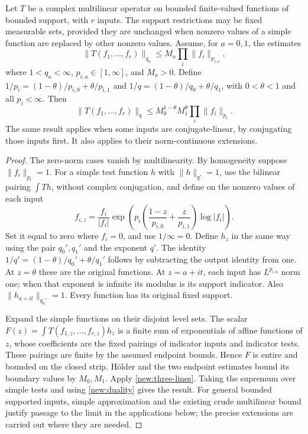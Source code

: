 \documentclass[11pt]{article}
\theoremstyle{definition}
\begin{document}
\begin{lemma}\label{new:interpolation}
Let $T$ be a complex multilinear operator on bounded finite-valued functions of bounded support,
with $r$ inputs. The support restrictions may be fixed measurable sets, provided they are unchanged
when nonzero values of a simple function are replaced by other nonzero values.
Assume, for $a=0,1$, the estimates
\[
 \|T(f_1,\ldots,f_r)\|_{q_a}\leq M_a\prod_i\|f_i\|_{p_{i,a}},
\]
where $1<q_a<\infty$, $p_{i,a}\in[1,\infty]$, and $M_a>0$.
Define $1/p_i=(1-\theta)/p_{i,0}+\theta/p_{i,1}$ and
$1/q=(1-\theta)/q_0+\theta/q_1$, with $0<\theta<1$ and all $p_i<\infty$.
Then
\[
 \|T(f_1,\ldots,f_r)\|_q\leq M_0^{1-\theta}M_1^\theta\prod_i\|f_i\|_{p_i}.
\]
The same result applies when some inputs are conjugate-linear, by conjugating those inputs
first. It also applies to their norm-continuous extensions.
\end{lemma}
\begin{proof}
The zero-norm cases vanish by multilinearity. By homogeneity suppose $\|f_i\|_{p_i}=1$.
For a simple test function $h$ with $\|h\|_{q'}=1$, use the bilinear pairing $\int Th$, without
complex conjugation, and define on the nonzero values of each input
\[
 f_{i,z}=\frac{f_i}{|f_i|}\exp\!\left(p_i\left(\frac{1-z}{p_{i,0}}+
                   \frac{z}{p_{i,1}}\right)\log|f_i|\right).
\]
Set it equal to zero where $f_i=0$, and use $1/\infty=0$. Define $h_z$ in the same way using
the pair $q_0',q_1'$ and the exponent $q'$. The identity
$1/q'=(1-\theta)/q_0'+\theta/q_1'$ follows by subtracting the output identity from one.
At $z=\theta$ these are the original functions. At $z=a+it$, each input has $L^{p_{i,a}}$
norm one; when that exponent is infinite its modulus is its support indicator. Also
$\|h_{a+it}\|_{q_a'}=1$. Every function has its original fixed support.

Expand the simple functions on their disjoint level sets. The scalar
$F(z)=\int T(f_{1,z},\ldots,f_{r,z})h_z$ is a finite sum of exponentials of affine functions
of $z$, whose coefficients are the fixed pairings of indicator inputs and indicator tests.
These pairings are finite by the assumed endpoint bounds. Hence $F$ is entire and bounded
on the closed strip. H\"older and the two endpoint estimates bound its boundary values by
$M_0,M_1$. Apply \cref{new:three-lines}. Taking the supremum over simple tests and using
\cref{new:duality} gives the result. For general bounded supported inputs, simple approximation
and the existing crude multilinear bound justify passage to the limit in the applications
below; the precise extensions are carried out where they are needed.
\end{proof}
\end{document}
